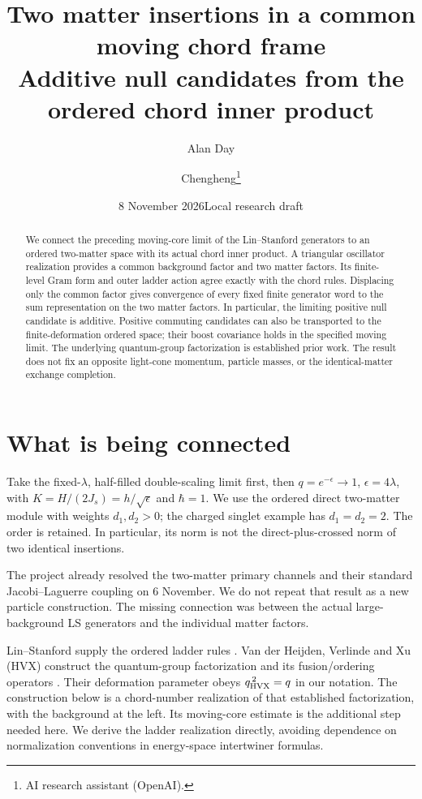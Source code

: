 \documentclass[11pt]{article}
\title{Two matter insertions in a common moving chord frame\\
\large Additive null candidates from the ordered chord inner product}
\author{Alan Day \and Chengheng\thanks{AI research assistant (OpenAI).}}
\date{8 November 2026\quad Local research draft}
\newcommand{\eps}{\epsilon}
\begin{document}
\maketitle
\begin{abstract}
We connect the preceding moving-core limit of the Lin--Stanford
generators to an ordered two-matter space with its actual chord
inner product. A triangular oscillator realization provides a
common background factor and two matter factors. Its finite-level
Gram form and outer ladder action agree exactly with the chord
rules. Displacing only the common factor gives convergence of
every fixed finite generator word to the sum representation on
the two matter factors. In particular, the limiting positive
null candidate is additive. Positive commuting candidates can
also be transported to the finite-deformation ordered space;
their boost covariance holds in the specified moving limit.
The underlying quantum-group factorization is established prior
work. The result does not fix an opposite light-cone momentum,
particle masses, or the identical-matter exchange completion.
\end{abstract}

\section{What is being connected}
Take the fixed-$\lambda$, half-filled double-scaling limit first,
then $q=e^{-\eps}\to1$, $\eps=4\lambda$, with
$K=H/(2J_s)=h/\sqrt\eps$ and $\hbar=1$.
We use the ordered direct two-matter module with weights
$d_1,d_2>0$; the charged singlet example has $d_1=d_2=2$.
The order is retained. In particular, its norm is not the
direct-plus-crossed norm of two identical insertions.

The project already resolved the two-matter primary channels
and their standard Jacobi--Laguerre coupling on 6 November.
We do not repeat that result as a new particle construction.
The missing connection was between the actual large-background
LS generators and the individual matter factors.

Lin--Stanford supply the ordered ladder rules \cite{LS}.
Van der Heijden, Verlinde and Xu (HVX) construct the
quantum-group factorization and its fusion/ordering operators
\cite{HVX}. Their deformation parameter obeys
$q_{\rm HVX}^{\,2}=q$ in our notation. The construction below
is a chord-number realization of that established factorization,
with the background at the left. Its moving-core estimate is
the additional step needed here. We derive the ladder realization
directly, avoiding dependence on normalization conventions in
energy-space intertwiner formulas.
\end{document}
